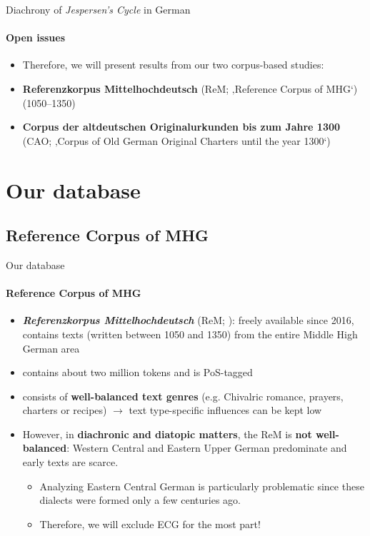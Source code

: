 \documentclass[xcolor=table, compress, %
handout
]{beamer}
\begin{document}
\begin{frame}{Diachrony of \textit{Jespersen's Cycle} in German}
\framesubtitle{Open issues}

\begin{itemize}
    \item Therefore, we will present results from our two corpus-based studies:
    \item \textbf{Referenzkorpus Mittelhochdeutsch} (ReM; ‚Reference Corpus of MHG‘) (1050–1350)
    \item \textbf{Corpus der altdeutschen Originalurkunden bis zum Jahre 1300} (CAO; ‚Corpus of Old German Original Charters until the year 1300‘)
\end{itemize}

\end{frame}

\section{Our database}
\subsection{Reference Corpus of MHG}
\begin{frame}{Our database}
\framesubtitle{Reference Corpus of MHG}

    \begin{itemize}
        \item \textbf{\textit{Referenzkorpus Mittelhochdeutsch}} (ReM; \citealt{kleinetal16,Klein2016}): freely available since 2016, contains texts (written between 1050 and 1350) from the entire Middle High German area 
        \item contains about two million tokens and is PoS-tagged
        \item consists of \textbf{well-balanced text genres} (e.g. Chivalric romance, prayers, charters or recipes) $\rightarrow$ text type-specific influences can be kept low
         \item However, in \textbf{diachronic and diatopic matters}, the ReM is \textbf{not well-balanced}: Western Central and Eastern Upper German predominate and early texts are scarce.
          \begin{itemize}
              \item[\Radioactivity] Analyzing Eastern Central German is particularly problematic since these dialects were formed only a few centuries ago.
              \item[\Radioactivity] Therefore, we will exclude ECG for the most part!
          \end{itemize}
    \end{itemize}

\end{frame}
\end{document}

